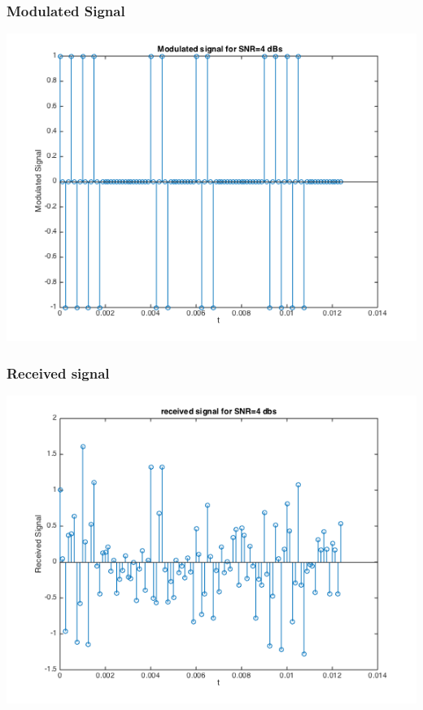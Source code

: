 \documentclass[11pt]{scrartcl}
\begin{document}
\subsubsection{Modulated Signal}
\label{sec:before}
\begin{minipage}[t]{\linewidth}
{
\includegraphics[scale = 0.6]{Modulated_signal.png}
}
\end{minipage}
\medskip

\subsubsection{Received signal}
\label{sec:after}
\begin{minipage}[t]{\linewidth}
{
\includegraphics[scale = 0.6]{received_signal.png}
}
\end{minipage}
\medskip
\end{document}
